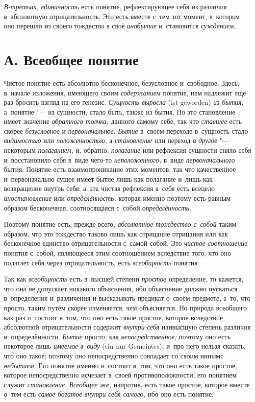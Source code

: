 {\em В-третьих, единичность} есть
понятие, рефлектирующее себя из различия в~абсолютную отрицательность. Это
есть вместе с~тем тот момент, в~котором оно перешло из своего тождества в
своё {\em инобытие} и~становится {\em суждением}.

\section[А. Всеобщее понятие]{А. Всеобщее понятие}

Чистое понятие есть абсолютно бесконечное, безусловное и~свободное. Здесь,
в~начале изложения, имеющего своим {\em содержанием} понятие, нам надлежит
ещё раз бросить взгляд на его генезис. {\em Сущность выросла} (ist geworden)
{\em из бытия,} а~понятие "--- из сущности, стало быть, также из бытия.
Но это становление имеет значение {\em обратного толчка,} данного самому себе,
так что {\em ставшее} есть скорее {\em безусловное} и {\em первоначальное}.
{\em Бытие} в~своём переходе в~сущность стало {\em видимостью} или
{\em положенностью,} а {\em становление} или переход
в {\em другое} "--- некоторым {\em полаганием;} и, обратно, {\em полагание}
или рефлексия сущности сняло себя и~восстановило себя в~виде чего-то
{\em неположенного,} в~виде {\em первоначального} бытия. Понятие есть
взаимопроникание этих моментов, так что качественное и~первоначально сущее
имеет бытие лишь как полагание и~лишь как возвращение внутрь себя, а~эта
чистая рефлексия в~себя есть всецело {\em иностановление} или
{\em определённость,} которая именно поэтому есть равным образом
бесконечная, соотносящаяся с~собой {\em определённость}.

Поэтому понятие есть, прежде всего, {\em абсолютное тождество с~собой}
таким образом, что это тождество таково лишь как отрицание
отрицания или как бесконечное единство отрицательности с~самой собой. Это
{\em чистое соотношение} понятия с~собой, являющееся этим соотношением
вследствие того, что оно полагает себя через отрицательность, есть
{\em всеобщность} понятия.

Так как {\em всеобщность} есть в~высшей степени {\em простое}
определение, то кажется, что она не допускает никакого
объяснения, ибо объяснение должно пускаться в~определения и~различения и
высказывать предикат о~своём предмете, а~то, что просто,
таким путём скорее изменяется, чем объясняется. Но природа
всеобщего как раз и~состоит в~том, что оно есть такое простое, которое
вследствие абсолютной отрицательности содержит {\em внутри себя}
наивысшую степень различия и~определённости. {\em Бытие} просто, как
{\em непосредственное;} поэтому оно есть некоторое лишь {\em имеемое в~виду}
(ein nur Gemeintes), и~про него нельзя сказать, чт\'{о} оно такое; поэтому
оно непосредственно совпадает со своим иинымс
{\em небытием}.
Его понятие именно и~состоит в~том, что оно есть такое
простое, которое непосредственно исчезает в~своей
противоположности; его понятием служит {\em становление}. {\em Всеобщее же,}
напротив, есть такое простое, которое вместе о~тем есть
{\em самое богатое внутри себя самого,} ибо оно есть понятие.


